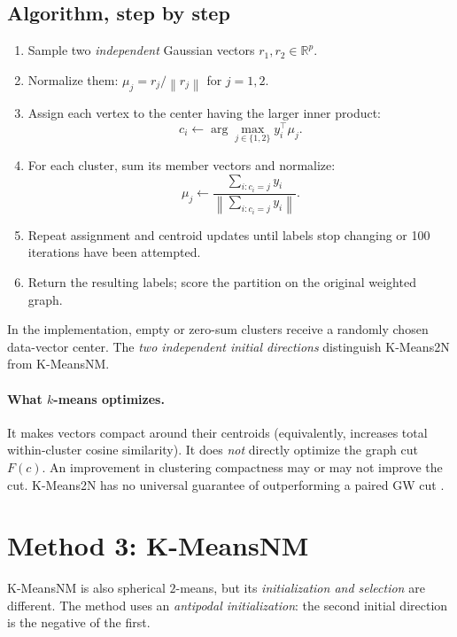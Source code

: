 \documentclass[10pt,letterpaper]{article}
\newcommand{\R}{\mathbb{R}}
\newcommand{\norm}[1]{\left\lVert#1\right\rVert}
\begin{document}
\subsection{Algorithm, step by step}
\begin{enumerate}
\item Sample two \emph{independent} Gaussian vectors $r_1,r_2\in\R^p$.
\item Normalize them: $\mu_j=r_j/\norm{r_j}$ for $j=1,2$.
\item Assign each vertex to the center having the larger inner product:
\begin{equation}\label{eq:assign}
 c_i\gets\arg\max_{j\in\{1,2\}}
 y_i^\top\mu_j.
\end{equation}
\item For each cluster, sum its member vectors and normalize:
\begin{equation}\label{eq:centroid}
 \mu_j\gets\frac{\sum_{i:c_i=j}y_i}
 {\left\|\sum_{i:c_i=j}y_i\right\|}.
\end{equation}
\item Repeat assignment and centroid updates until labels stop changing or 100 iterations have been attempted.
\item Return the resulting labels; score the partition on the original weighted graph.
\end{enumerate}
In the implementation, empty or zero-sum clusters receive a randomly chosen data-vector center. The \emph{two independent initial directions} distinguish K-Means2N from K-MeansNM.

\paragraph{What $k$-means optimizes.} It makes vectors compact around their centroids (equivalently, increases total within-cluster cosine similarity). It does \emph{not} directly optimize the graph cut $F(c)$. An improvement in clustering compactness may or may not improve the cut. K-Means2N has no universal guarantee of outperforming a paired GW cut \cite{rodriguez2020}.

\section{Method 3: K-MeansNM}
\label{sec:nm}
K-MeansNM is also spherical $2$-means, but its \emph{initialization and selection} are different. The method uses an \emph{antipodal initialization}: the second initial direction is the negative of the first.
\end{document}
